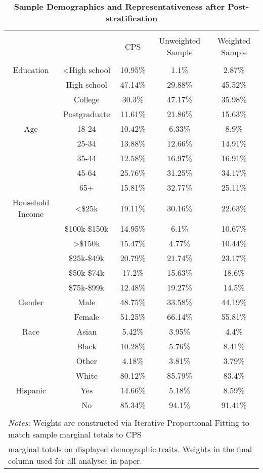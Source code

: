 
\begin{table}[!htbp] \centering 
  \caption{\textbf{Sample Demographics and Representativeness after Post-stratification}} 
  \label{weiights} 
\footnotesize 
\begin{tabular}{@{\extracolsep{5pt}} ccccc} 
\\[-1.8ex]\hline 
\hline \\[-1.8ex] 
 &  & CPS & Unweighted Sample & Weighted Sample \\ 
\hline \\[-1.8ex] 
Education & \textless High school & 10.95\% & 1.1\% & 2.87\% \\ 
 & High school & 47.14\% & 29.88\% & 45.52\% \\ 
 & College & 30.3\% & 47.17\% & 35.98\% \\ 
 & Postgraduate & 11.61\% & 21.86\% & 15.63\% \\ 
Age & 18-24 & 10.42\% & 6.33\% & 8.9\% \\ 
 & 25-34 & 13.88\% & 12.66\% & 14.91\% \\ 
 & 35-44 & 12.58\% & 16.97\% & 16.91\% \\ 
 & 45-64 & 25.76\% & 31.25\% & 34.17\% \\ 
 & 65+ & 15.81\% & 32.77\% & 25.11\% \\ 
Household Income & \textless \$25k & 19.11\% & 30.16\% & 22.63\% \\ 
 & \$100k-\$150k & 14.95\% & 6.1\% & 10.67\% \\ 
 & \textgreater \$150k & 15.47\% & 4.77\% & 10.44\% \\ 
 & \$25k-\$49k & 20.79\% & 21.74\% & 23.17\% \\ 
 & \$50k-\$74k & 17.2\% & 15.63\% & 18.6\% \\ 
 & \$75k-\$99k & 12.48\% & 19.27\% & 14.5\% \\ 
Gender & Male & 48.75\% & 33.58\% & 44.19\% \\ 
 & Female & 51.25\% & 66.14\% & 55.81\% \\ 
Race & Asian & 5.42\% & 3.95\% & 4.4\% \\ 
 & Black & 10.28\% & 5.76\% & 8.41\% \\ 
 & Other & 4.18\% & 3.81\% & 3.79\% \\ 
 & White & 80.12\% & 85.79\% & 83.4\% \\ 
Hispanic & Yes & 14.66\% & 5.18\% & 8.59\% \\ 
 & No & 85.34\% & 94.1\% & 91.41\% \\ 
\hline \\[-1.8ex] 
\multicolumn{5}{l}{\scriptsize \textit{Notes:} Weights are constructed via Iterative Proportional Fitting to match sample marginal totals to CPS} \\ 
\multicolumn{5}{l}{\scriptsize marginal totals on displayed demographic traits. Weights in the final column used for all analyses in paper.} \\ 
\end{tabular} 
\end{table} 
